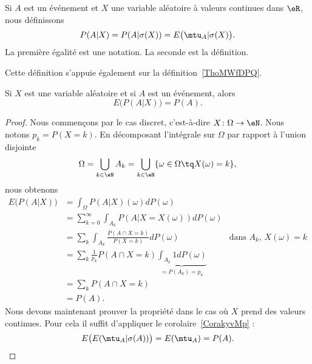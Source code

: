 \begin{definition}      \label{DEFooIUJMooBAVtMW}
    Si \( A\) est un événement et \( X\) une variable aléatoire à valeurs continues dans \( \eR\), nous définissons
    \begin{equation}
        P(A|X)=P(A|\sigma(X))=E\big( \mtu_A|\sigma(X) \big).
    \end{equation}
    La première égalité est une notation. La seconde est la définition.
\end{definition}
Cette définition s'appuie également sur la définition~\ref{ThoMWfDPQ}.

\begin{proposition}
    Si \( X\) est une variable aléatoire et si \( A\) est un événement, alors
    \begin{equation}
        E\big( P(A|X) \big)=P(A).
    \end{equation}
\end{proposition}

\begin{proof}
    Nous commençons par le cas discret, c'est-à-dire \( X\colon \Omega\to \eN\). Nous notons \( p_k=P(X=k)\). En décomposant l'intégrale sur \( \Omega\) par rapport à l'union disjointe
    \begin{equation}
        \Omega=\bigcup_{k\in \eN}A_k=\bigcup_{k\in \eN}\{ \omega\in\Omega \tq X(\omega)=k\},
    \end{equation}
    nous obtenons
    \begin{subequations}
        \begin{align}
            E\big( P(A|X) \big)&=\int_{\Omega}P(A|X)(\omega)dP(\omega)\\
            &=\sum_{k=0}^{\infty}\int_{A_k}P(A|X=X(\omega))dP(\omega)\\
            &=\sum_k\int_{A_k}\frac{ P(A\cap X=k) }{ P(X=k) }dP(\omega) & \text{dans } A_k\text{, } X(\omega)=k\\
            &=\sum_k\frac{1}{ p_k }P(A\cap X=k)\underbrace{\int_{A_k}1dP(\omega)}_{=P(A_k)=p_k}\\
            &=\sum_{k}P(A\cap X=k)\\
            &=P(A).
        \end{align}
    \end{subequations}
    Nous devons maintenant prouver la propriété dans le cas où \( X\) prend des valeurs continues. Pour cela il suffit d'appliquer le corolaire~\ref{CorakyvMp} :
    \begin{equation}
        E\big( E(\mtu_A|\sigma(A)) \big)=E(\mtu_A)=P(A).
    \end{equation}
\end{proof}

